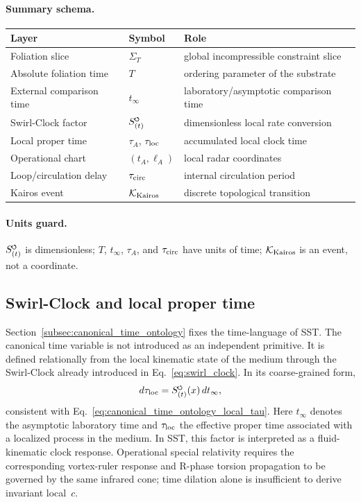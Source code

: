 \documentclass[11pt]{article}
\theoremstyle{definition}
\theoremstyle{plain}
\theoremstyle{remark}
\newcommand{\swirlarrow}{\mathchoice{\mkern-2mu\scriptstyle\boldsymbol{\circlearrowleft}}{\mkern-2mu\scriptstyle\boldsymbol{\circlearrowleft}}{\mkern-2mu\scriptscriptstyle\boldsymbol{\circlearrowleft}}{\mkern-2mu\scriptscriptstyle\boldsymbol{\circlearrowleft}}}
\newcommand{\SwirlClock}{{S_{(t)}^{\swirlarrow}}}
\begin{document}
        \paragraph{Summary schema.}
        \begin{center}
        \begin{tabular}{lll}
        \hline
        Layer & Symbol & Role \\
        \hline
        Foliation slice & \(\Sigma_T\) & global incompressible constraint slice \\
        Absolute foliation time & \(T\) & ordering parameter of the substrate \\
        External comparison time & \(t_{\infty}\) & laboratory/asymptotic comparison time \\
        Swirl-Clock factor & \(\SwirlClock\) & dimensionless local rate conversion \\
        Local proper time & \(\tau_A\), \(\tau_{\rm loc}\) & accumulated local clock time \\
        Operational chart & \((t_A,\ell_A)\) & local radar coordinates \\
        Loop/circulation delay & \(\tau_{\rm circ}\) & internal circulation period \\
        Kairos event & \(\mathcal{K}_{\rm Kairos}\) & discrete topological transition \\
        \hline
        \end{tabular}
        \end{center}

        \paragraph{Units guard.}
        \(\SwirlClock\) is dimensionless; \(T\), \(t_{\infty}\), \(\tau_A\), and
        \(\tau_{\rm circ}\) have units of time; \(\mathcal{K}_{\rm Kairos}\) is an
        event, not a coordinate.

    \subsection{Swirl-Clock and local proper time}
        Section~\ref{subsec:canonical_time_ontology} fixes the time-language of SST.
        The canonical time variable is not introduced as an independent primitive. It is defined relationally from the local kinematic state of the medium through the Swirl-Clock already introduced in Eq.~\eqref{eq:swirl_clock}. In its coarse-grained form,
        \begin{align}
            d\tau_{\rm loc} = \SwirlClock(x)\,dt_{\infty},
        \end{align}
        consistent with Eq.~\eqref{eq:canonical_time_ontology_local_tau}.  Here $t_{\infty}$ denotes the asymptotic laboratory time and $\tau_{\rm loc}$ the effective proper time associated with a localized process in the medium. In SST, this factor is interpreted as a fluid-kinematic clock response. Operational special relativity requires the corresponding vortex-ruler response and R-phase torsion propagation to be governed by the same infrared cone; time dilation alone is insufficient to derive invariant local~\(c\).
\end{document}

